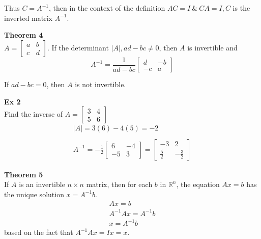 \documentclass{article}
\begin{document}
  Thus $ C=A^{-1}  $, then in the context of the definition $ AC =I ~\&~ CA=I,C$ is the inverted matrix $ A^{-1}$.   
  
  \textbf{Theorem 4}\\
  $ A = \begin{bmatrix}
      a &b\\
      c &d
  \end{bmatrix} $. If the determinant $ |A|, ad-bc \neq 0$, then $ A $ is invertible and
  \[
      A^{-1}=\frac{1}{ad-bc} \begin{bmatrix}
          d &-b\\
          -c &a
      \end{bmatrix} 
  \]

  If $ ad-bc =0$, then $ A $ is not invertible. 

  \textbf{Ex 2}\\
  Find the inverse of $ A=\begin{bmatrix}
      3 &4\\
      5 &6
  \end{bmatrix} $
  \[
      \begin{gathered}
        |A|=3(6)-4(5)=-2\\
        ~\\
      A^{-1} = -\frac{1}{2}\begin{bmatrix}
          6 &-4\\
          -5 &3
      \end{bmatrix} =
      \begin{bmatrix}
          -3 &2\\
          \frac{5}{2}  &-\frac{3}{2} 
      \end{bmatrix}
      \end{gathered}
  \]
  
  \textbf{Theorem 5}\\
  If $ A $ is an invertible $ n \times n $ matrix, then for each $ b $ in $ \mathbb{R}^{n}$, the equation $ Ax=b $ has the unique solution $ x=A^{-1}b$.
  \[
    \begin{gathered}
      Ax=b \\ A^{-1}Ax = A^{-1}b \\ x=A^{-1}b
    \end{gathered}
  \]
  based on the fact that $ A^{-1}Ax =Ix = x$.
\end{document}
